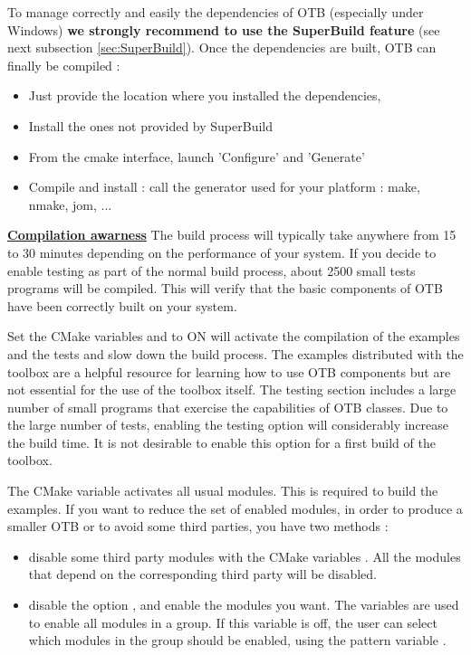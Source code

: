 To manage correctly and easily the dependencies of OTB (especially under Windows) \textbf{we strongly recommend to use the SuperBuild feature} (see next subsection \ref{sec:SuperBuild}).
Once the dependencies are built, OTB can finally be compiled : 
\begin{itemize}
	\item Just provide the location where you installed the dependencies, 
	\item Install the ones not provided by SuperBuild
    \item From the cmake interface, launch 'Configure' and 'Generate'
    \item Compile and install : call the generator used for your platform : make, nmake, jom, ... 
\end{itemize}

\textbf{\underline{Compilation awarness}}
The build process will typically take anywhere from 15 to 30 minutes depending on the performance of your system. If you decide to enable testing as part of the normal build process, about 2500 small tests programs will be compiled. This will verify that the basic components of OTB have been correctly built on your system.

Set the CMake variables  and  to ON will activate the compilation of the examples and the tests and slow down the build process. The examples distributed with the toolbox are a helpful resource for learning how to use OTB components but are not essential for the use of the toolbox itself. The testing section includes a large number of small programs that exercise the capabilities of OTB classes. Due to the large number of tests, enabling the testing option will considerably increase the build time.  It is not desirable to enable this option for a first build of the toolbox.

The CMake variable  activates all usual modules. This is required to build the examples. If you want to reduce the set of enabled modules, in order to produce a smaller OTB or to avoid some third parties, you have two methods :
\begin{itemize}
  \item disable some third party modules with the CMake variables . All the modules that depend on the corresponding third party will be disabled.
  \item disable the option , and enable the modules you want. The variables  are used to enable all modules in a group. If this variable is off, the user can select which modules in the group should be enabled, using the pattern variable .
\end{itemize}


